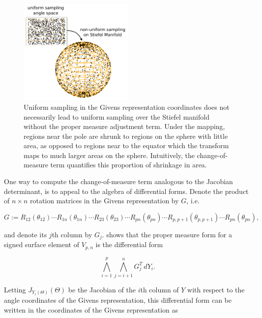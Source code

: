 \documentclass[ba]{imsart}
\numberwithin{equation}{section}
\theoremstyle{plain}
\begin{document}
\begin{figure}[h]
\centering
\vspace{.1in}
\includegraphics[width=0.5\textwidth]{figures/AreaForm_atz.pdf}
\vspace{.05in}
\caption{Uniform sampling in the Givens representation coordinates does not necessarily lead to uniform sampling over the Stiefel manifold without the proper measure adjustment term. Under the mapping, regions near the pole are shrunk to regions on the sphere with little area, as opposed to regions near to the equator which the transform maps to much larger areas on the sphere. Intuitively, the change-of-measure term quantifies this proportion of shrinkage in area.}
\label{fig:AreaForm}
\end{figure}


\noindent One way to compute the change-of-measure term analogous to the Jacobian determinant, is to appeal to the algebra of differential forms. Denote the product of $n \times n$ rotation matrices in the Givens representation by $G$, i.e. 

\begin{equation}
G := R_{12}(\theta_{12}) \cdots R_{1n}(\theta_{1n})  \cdots R_{23}(\theta_{23}) \cdots R_{pn}(\theta_{pn}) \cdots R_{p,p+1}(\theta_{p,p+1}) \cdots R_{pn}(\theta_{pn}),
\end{equation}

\noindent and denote its $j$th column by $G_j$. \cite{muirhead2009aspects} shows that the proper measure form for a signed surface element of $V_{p,n}$ is the differential form

\begin{equation}
\label{eq:WedgeForm}
\bigwedge_{i=1}^p \bigwedge_{j=i+1}^n G_j^T\, dY_i.
\end{equation}

\noindent Letting $J_{Y_i(\Theta)}(\Theta)$ be the Jacobian of the $i$th column of $Y$ with respect to the angle coordinates of the Givens representation, this differential form can be written in the coordinates of the Givens representation as
\end{document}
